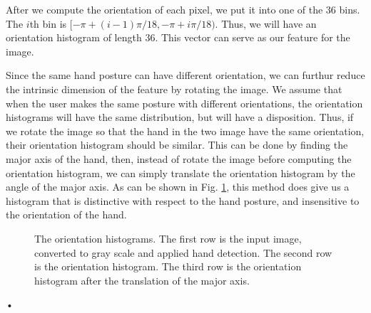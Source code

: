 After we compute the orientation of each pixel, we put it into one of the $36$ bins. The $i$th bin is $[-\pi+(i-1)\pi/18, -\pi+i\pi/18)$. Thus, we will have an orientation histogram of length $36$. This vector can serve as our feature for the image. 

Since the same hand posture can have different orientation, we can furthur reduce the intrinsic dimension of the feature by rotating the image. We assume that when the user makes the same posture with different orientations, the orientation histograms will have the same distribution, but will have a disposition. Thus, if we rotate the image so that the hand in the two image have the same orientation, their orientation histogram should be similar. This can be done by finding the major axis of the hand, then, instead of rotate the image before computing the orientation histogram, we can simply translate the orientation histogram by the angle of the major axis. As can be shown in Fig. \ref{fig:or_hist}, this method does give us a histogram that is distinctive with respect to the hand posture, and insensitive to the orientation of the hand. 
\begin{figure}

\caption{The orientation histograms. The first row is the input image, converted to gray scale and applied hand detection. The second row is the orientation histogram. The third row is the orientation histogram after the translation of the major axis.}
\label{fig:or_hist}
\end{figure}•

